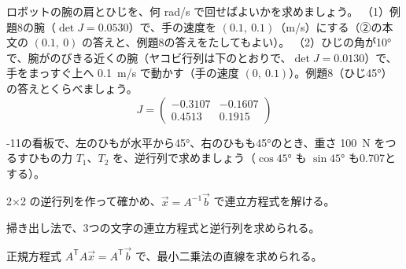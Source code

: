 \bkproblem ロボットの腕の肩とひじを、何 rad/s で回せばよいかを求めましょう。\newline
（1）\nobreak 例題8の腕（$\det J=0.0530$）で、手の速度を $(0.1,\ 0.1)$（m/s）にする（②の本文の $(0.1,\ 0)$ の答えと、例題8の答えをたしてもよい）。\newline
（2）\nobreak ひじの角が10°で、腕がのびきる近くの腕（ヤコビ行列は下のとおりで、$\det J=0.0130$）で、手をまっすぐ上へ \qty{0.1}{m/s} で動かす（手の速度 $(0,\ 0.1)$）。例題8（ひじ45°）の答えとくらべましょう。
\[ J=\begin{pmatrix}-0.3107&-0.1607\\0.4513&0.1915\end{pmatrix} \]

-11の看板で、左のひもが水平から45°、右のひもも45°のとき、重さ \qty{100}{N} をつるすひもの力 $T_1$、$T_2$ を、逆行列で求めましょう（$\cos45°$ も $\sin45°$ も0.707とする）。


\begin{furikaeri}
\begin{checklist}
\item 2×2 の逆行列を作って確かめ、$\vec x=A^{-1}\vec b$ で連立方程式を解ける。
\item 掃き出し法で、3つの文字の連立方程式と逆行列を求められる。
\item 正規方程式 $A^{\mathsf T}A\vec x=A^{\mathsf T}\vec b$ で、最小二乗法の直線を求められる。
\end{checklist}
\end{furikaeri}

